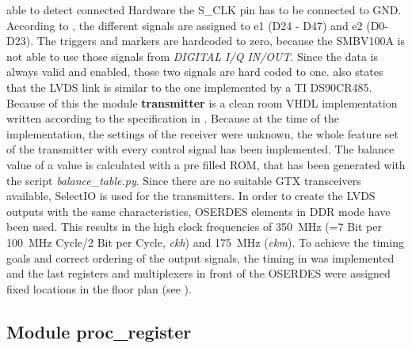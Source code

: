 \documentclass[11pt,technote,a4paper,onecolumn]{IEEEtran}
\newcommand{\signal}[1]{{\ttfamily #1}}
\newcommand{\module}[1]{{\ttfamily\bfseries #1}}
\newcommand{\clk}[1]{{\itshape\ttfamily #1}}
\begin{document}
able to detect connected Hardware the S\_CLK pin has to be connected to GND.
According to \cite[p. 10]{fsq_b17}, the different signals are assigned to
\signal{e1} (D24 - D47) and \signal{e2} (D0-D23). The triggers and markers are
hardcoded to zero, because the SMBV100A is not able to use those signals from
\emph{DIGITAL I/Q IN/OUT}. Since the data is always valid and enabled, those two
signals are hard coded to one. \cite[p. 10]{fsq_b17} also states that the LVDS
link is similar to the one implemented by a TI DS90CR485. Because of this the module
\module{transmitter} is a clean room VHDL implementation written according to
the specification in \cite{ds90cr485}. Because at the time of the implementation,
the settings of the receiver were unknown, the whole feature set of the
transmitter with every control signal has been implemented. The balance value
of a value is calculated with a pre filled ROM, that has been generated with
the script \emph{balance\_table.py}. Since there are no suitable GTX
transceivers \cite{gtx} available, SelectIO\cite[p. 270ff]{virtex5} is used
for the transmitters. In order to create the LVDS outputs with the same
characteristics, OSERDES \cite[p. 370ff]{virtex5} elements in
DDR mode have been used. This results in the high clock frequencies of
\SI{350}{MHz} (=7 Bit per \SI{100}{MHz} Cycle/2 Bit per Cycle, \clk{ckh}) and
\SI{175}{MHz} (\clk{ckm}). To achieve the timing goals and correct ordering
of the output signals, the timing in  was implemented and the
last registers and multiplexers in front of the OSERDES
\cite[p. 370ff]{virtex5} were assigned fixed locations in the floor plan
(see ).

\subsection{Module \module{proc\_register}}
\label{sec:register}
\end{document}
